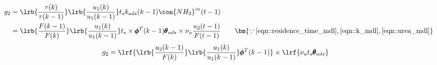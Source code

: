 \begin{align*}
        g_2 &= \lrb{\frac{\tau(k)}{\tau(k-1)}}
                                \lrb{\frac{u_1(k)}{u_1(k-1)}}
                t_s k_{ads}(k-1) \con{NH_3}^{in}(t-1)\\
        &=\lrb{\frac{F(k-1)}{F(k)}}\lrb{\frac{u_1(k)}{u_1(k-1)}}
                t_s \times \pmb \phi^T(k-1) \pmb \theta_{ads} \times \nu_u \frac{u_2(t-1)}{F(t-1)}
                \qquad
                \bm{\because \ref{eqn::residence_time_mdl}, \ref{eqn::k_mdl}, \ref{eqn::urea_mdl}}
\end{align*}
\begin{align}
       g_2 &=  \lrf{\lrb{\frac{u_2(k-1)}{F(k)}}\lrb{\frac{u_1(k)}{u_1(k-1)}} \pmb \phi^T(k-1) }
                \times \lrf{\nu_u t_s \pmb \theta_{ads}}
\end{align}
